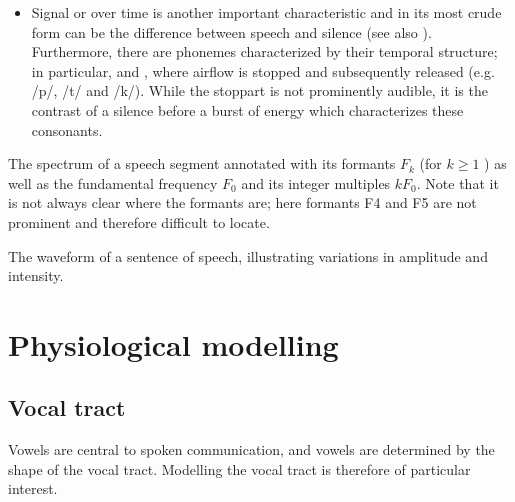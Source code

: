 \documentclass[letterpaper,10pt,english]{jupyterBook}
\begin{document}
\begin{itemize}
\item {} 
\sphinxAtStartPar
Signal  or  over time is another important
characteristic and in its most crude form can be the difference
between speech and silence (see also ). Furthermore, there are
phonemes characterized by their temporal structure; in particular,
 and , where airflow is stopped and
subsequently released (e.g. /p/, /t/ and /k/). While the stop\sphinxhyphen{}part
is not prominently audible, it is the contrast of a silence before a
burst of energy which characterizes these consonants.

\end{itemize}

\sphinxAtStartPar
The spectrum of a speech segment annotated with its formants \(F_k\) (for \( k\geq 1 \) ) as well as the fundamental frequency \(F_0\) and
its integer multiples \(kF_0\). Note that it is not always clear
where the formants are; here formants F4 and F5 are not prominent and
therefore difficult to
locate.

\sphinxAtStartPar
The waveform of a sentence of speech, illustrating variations in
amplitude and intensity.

\sphinxAtStartPar
{}


\section{Physiological modelling}
\label{\detokenize{Introduction/Speech_production_and_acoustic_properties:physiological-modelling}}

\subsection{Vocal tract}
\label{\detokenize{Introduction/Speech_production_and_acoustic_properties:vocal-tract}}
\sphinxAtStartPar
Vowels are central to spoken communication, and vowels are determined by
the shape of the vocal tract. Modelling the vocal tract is therefore of
particular interest.
\end{document}
